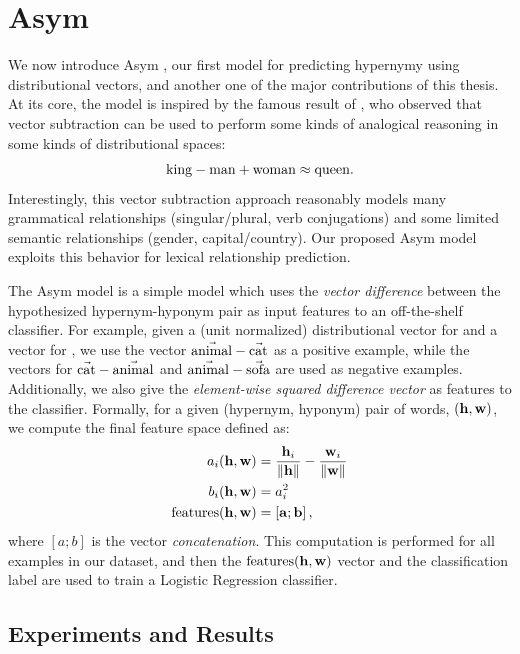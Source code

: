 \section{Asym}

We now introduce Asym \cite{roller:2014:coling}, our first model for
predicting hypernymy using distributional vectors, and another one of the major
contributions of this thesis. At its core, the model is
inspired by the famous result of , who observed that
vector subtraction can be used to perform some kinds of analogical reasoning in
some kinds of distributional spaces:
\begin{equation*}
  \mathbf{\text{king}} - \mathbf{\text{man}} + \mathbf{\text{woman}} \approx \mathbf{\text{queen}}.
\end{equation*}
Interestingly, this vector subtraction approach reasonably models many
grammatical relationships (singular/plural, verb conjugations) and some limited
semantic relationships (gender, capital/country). Our proposed Asym model
exploits this behavior for lexical relationship prediction.

The Asym model is a simple model which uses the {\em vector difference} between
the hypothesized hypernym-hyponym pair as input features to an off-the-shelf
classifier. For example, given a (unit normalized) distributional vector for
 and a vector for , we use the vector
$\vec{\mbox{animal}} - \vec{\mbox{cat}}$ as a positive example, while the
vectors for $\vec{\mbox{cat}} - \vec{\mbox{animal}}$ and
$\vec{\mbox{animal}} - \vec{\mbox{sofa}}$ are used as negative examples. Additionally,
we also give the {\em element-wise squared difference vector} as features to
the classifier. Formally, for a given (hypernym, hyponym) pair of words,
$({\mathbf{h}}, {\mathbf{w}})$, we compute the final feature space defined as:
\begin{align}
\begin{split}
  a_i({\mathbf{h}}, {\mathbf{w}}) & = \frac{{\mathbf{h}}_i}{\lVert {\mathbf{h}} \rVert} - \frac{{\mathbf{w}}_i}{\lVert {\mathbf{w}} \rVert}\\
  b_i({\mathbf{h}}, {\mathbf{w}}) & = a_i^2\\
  \mbox{features}({\mathbf{h}}, {\mathbf{w}}) & = \left[{\mathbf{a}}; {\mathbf{b}}\right],
\end{split}
\label{eqn:asym}
\end{align}
where $[a; b]$ is the vector {\em concatenation}. This computation
is performed for all examples in our dataset, and then the $\mbox{features}({\mathbf{h}}, {\mathbf{w}})$
vector and the classification label are used to train a Logistic Regression
classifier.

\subsection{Experiments and Results}

